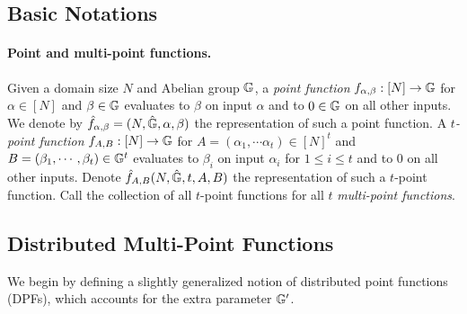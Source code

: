 \subsection{Basic Notations}



 \paragraph{Point and multi-point functions.} Given a domain size $N$ and Abelian group $\mathbb{G}$, a \emph{point function} $f_{\alpha,\beta}:[N]\rightarrow\mathbb{G}$ for $\alpha\in[N]$ and $\beta\in\mathbb{G}$ evaluates to $\beta$ on input $\alpha$ and to $0\in\mathbb{G}$ on all other inputs. We denote by $\hat{f}_{\alpha,\beta}=(N,\hat{\mathbb{G}},\alpha,\beta)$ the representation of such a point function. A \emph{$t$-point function} $f_{A,B}:[N]\rightarrow \mathbb{G}$ for $A=(\alpha_1,\cdots\alpha_t)\in[N]^t$ and $B=(\beta_1,\cdots,\beta_t)\in \mathbb{G}^t$ evaluates to $\beta_i$ on input $\alpha_i$ for $1\le i\le t$ and to $0$ on all other inputs. Denote $\hat{f}_{A,B}(N,\hat{\mathbb{G}},t,A,B)$ the representation of such a $t$-point function. Call the collection of all $t$-point functions for all $t$ \emph{multi-point functions}. 
 
 
\subsection{Distributed Multi-Point Functions}


We begin by defining a slightly generalized notion of distributed point functions (DPFs), which accounts for the extra parameter $\mathbb{G}'$. 

